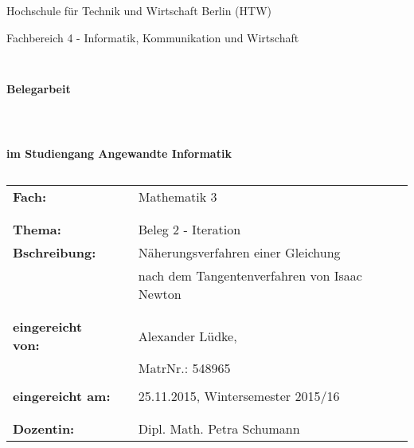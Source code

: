 \documentclass[a4paper]{scrartcl}
\begin{document}
\thispagestyle{empty}

%
%
\thispagestyle{empty}
\begin{center}
\Large{Hochschule für Technik und Wirtschaft Berlin (HTW)}\\
\end{center}
 
 
\begin{center}
\Large{Fachbereich 4 - Informatik, Kommunikation und Wirtschaft}
\end{center}
\begin{verbatim}


\end{verbatim}
\begin{center}
\textbf{\LARGE{Belegarbeit}}
\end{center}
\begin{verbatim}
 
 
\end{verbatim}
\begin{center}
\textbf{im Studiengang Angewandte Informatik}
\end{center}
\begin{verbatim}
\end{verbatim}
 
\begin{flushleft}
\begin{tabular}{lll}
\textbf{Fach:} & & Mathematik 3\\
& & \\
& & \\
\textbf{Thema:} & & Beleg 2 - Iteration\\
\textbf{Bschreibung:}& & Näherungsverfahren einer Gleichung \\
\textbf{}& & nach dem Tangentenverfahren von Isaac Newton \\
& & \\
& & \\
\textbf{eingereicht von:} & & Alexander Lüdke,\\
& & MatrNr.: 548965\\
& & \\
\textbf{eingereicht am:} & & 25.11.2015, Wintersemester 2015/16 \\
& & \\
& & \\
\textbf{Dozentin:} & & Dipl. Math. Petra Schumann
\end{tabular}
\end{flushleft}

\newpage
\end{document}
